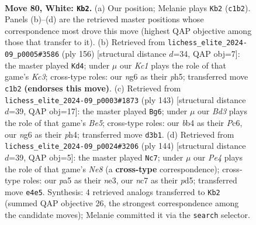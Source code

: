 \documentclass[11pt]{article}
\begin{document}
\clearpage

\begin{figure}[p]\centering
\begin{subfigure}{0.46\textwidth}\centering
\resizebox{\linewidth}{!}{%
\newchessgame
\chessboard[
  setfen={8/1Nn5/6n1/p5k1/Pb1pP3/1P1B3p/4P3/2K5 w - - 26 80},
  showmover=false,
  pgfstyle=straightmove, color=movearrow, markmove={c1-b2}
]}
\caption{}
\end{subfigure}\hfill
\begin{subfigure}{0.46\textwidth}\centering
\resizebox{\linewidth}{!}{%
\newchessgame
\chessboard[
  setfen={8/8/p3pBk1/Pb2P2p/1P5P/2K5/8/8 w - - 38 79},
  showmover=false,
  pgfstyle=straightmove, color=movearrow, markmove={c3-d4}
]}
\caption{}
\end{subfigure}
\\[4pt]
\begin{subfigure}{0.46\textwidth}\centering
\resizebox{\linewidth}{!}{%
\newchessgame
\chessboard[
  setfen={8/8/2p2k1p/1p1p4/1P1Pb2P/6K1/4B3/8 b - - 3 72},
  showmover=false,
  pgfstyle=straightmove, color=movearrow, markmove={e4-g6}
]}
\caption{}
\end{subfigure}\hfill
\begin{subfigure}{0.46\textwidth}\centering
\resizebox{\linewidth}{!}{%
\newchessgame
\chessboard[
  setfen={4N3/1p2k3/1B3p2/P2p4/3P2P1/4n3/4K3/6b1 w - - 19 73},
  showmover=false,
  pgfstyle=straightmove, color=movearrow, markmove={e8-c7}
]}
\caption{}
\end{subfigure}
\caption{\textbf{Move 80, White: \texttt{Kb2}.} (a) Our position; Melanie plays \texttt{Kb2} (\texttt{c1b2}). Panels (b)--(d) are the retrieved master positions whose correspondence most drove this move (highest QAP objective among those that transfer to it). (b) Retrieved from \texttt{lichess\_elite\_2024-09\_p0005\#3586} (ply 156) [structural distance $d$=34, QAP obj=7]: the master played \texttt{Kd4}; under $\mu$ our \emph{Kc1} plays the role of that game's \emph{Kc3}; cross-type roles: our \emph{n}g6 as their \emph{p}h5; transferred move \texttt{c1b2} \textbf{(endorses this move)}. (c) Retrieved from \texttt{lichess\_elite\_2024-09\_p0003\#1873} (ply 143) [structural distance $d$=39, QAP obj=17]: the master played \texttt{Bg6}; under $\mu$ our \emph{Bd3} plays the role of that game's \emph{Be5}; cross-type roles: our \emph{b}b4 as their \emph{P}c6, our \emph{n}g6 as their \emph{p}h4; transferred move \texttt{d3b1}. (d) Retrieved from \texttt{lichess\_elite\_2024-09\_p0024\#3206} (ply 144) [structural distance $d$=39, QAP obj=5]: the master played \texttt{Nc7}; under $\mu$ our \emph{Pe4} plays the role of that game's \emph{Ne8} (a \textbf{cross-type} correspondence); cross-type roles: our \emph{p}a5 as their \emph{n}e3, our \emph{n}c7 as their \emph{p}d5; transferred move \texttt{e4e5}. Synthesis: 4 retrieved analogs transferred to \texttt{Kb2} (summed QAP objective 26, the strongest correspondence among the candidate moves); Melanie committed it via the \texttt{search} selector.}
\label{fig:thought-m158}
\end{figure}
\end{document}
